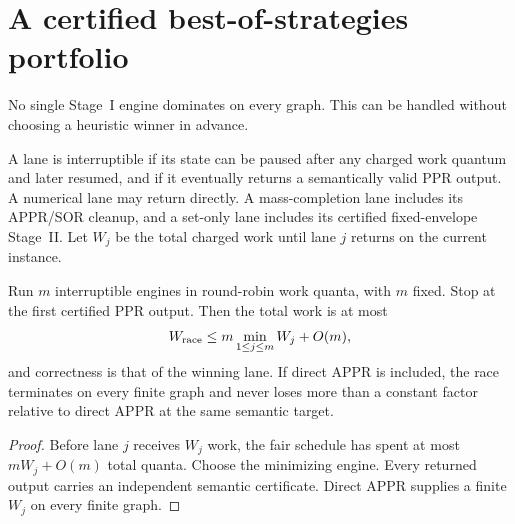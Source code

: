 \section{A certified best-of-strategies portfolio}
\label{sec:two-stage-race}

No single Stage~I engine dominates on every graph.  This can be handled
without choosing a heuristic winner in advance.

\begin{definition}
A lane is interruptible if its state can be paused after any charged work
quantum and later resumed, and if it eventually returns a semantically valid
PPR output.  A numerical lane may return directly.  A mass-completion lane
includes its APPR/SOR cleanup, and a set-only lane includes its certified
fixed-envelope Stage~II.  Let $W_j$ be the total charged work until lane $j$
returns on the current instance.
\end{definition}

\begin{theorem}
\label{thm:two-stage-certificate-race}
Run $m$ interruptible engines in round-robin work quanta, with $m$ fixed.
Stop at the first certified PPR output.  Then the total work is at most
\begin{equation}
 W_{\rm race}\leq m\min_{1\leq j\leq m}W_j+O(m),
 \label{eq:two-stage-race-work}
\end{equation}
and correctness is that of the winning lane.  If direct APPR is included,
the race terminates on every finite graph and never loses more than a constant
factor relative to direct APPR at the same semantic target.
\end{theorem}

\begin{proof}
Before lane $j$ receives $W_j$ work, the fair schedule has spent at most
$mW_j+O(m)$ total quanta.  Choose the minimizing engine.  Every returned
output carries an independent semantic certificate.  Direct APPR supplies a
finite $W_j$ on every finite graph.
\end{proof}


